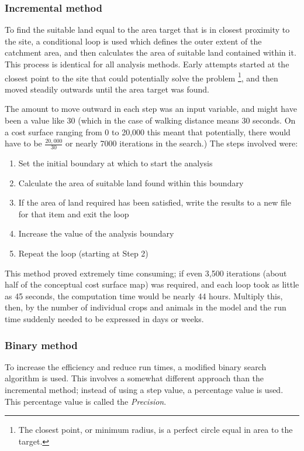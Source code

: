 \subsubsection{Incremental method}
	\label{IncrementalMethod}
To find the suitable land equal to the area target that is in closest proximity to the site, a conditional loop is used which defines the outer extent of the catchment area, and then calculates the area of suitable land contained within it. This process is identical for all analysis methods. Early attempts started at the closest point to the site that could potentially solve the problem \footnote{The closest point, or minimum radius, is a perfect circle equal in area to the target.}, and then moved steadily outwards until the area target was found. 

The amount to move outward in each step was an input variable, and might have been a value like 30 (which in the case of walking distance means 30 seconds.  On a cost surface ranging from 0 to 20,000 this meant that potentially, there would have to be $\frac{20,000}{30}$ or nearly 7000 iterations in the search.) The steps involved were: 
\begin{enumerate}
	\item Set the initial boundary at which to start the analysis 
	\item Calculate the area of suitable land found within this boundary 
	\item If the area of land required has been satisfied, write the results to a new file for that item and exit the loop 
	\item Increase the value of the analysis boundary 
	\item Repeat the loop (starting at Step 2) 
\end{enumerate}

This method proved extremely time consuming; if even 3,500 iterations (about half of the conceptual cost surface map) was required, and each loop took as little as 45 seconds, the computation time would be nearly 44 hours. Multiply this, then, by the number of individual crops and animals in the model and the run time suddenly needed to be expressed in days or weeks. 

\subsubsection{Binary method}
	\label{BinaryMethod}
To increase the efficiency and reduce run times, a modified binary search algorithm is used. This involves a somewhat different approach than the incremental method; instead of using a step value, a percentage value is used. This percentage value is called the \textit{Precision}.

